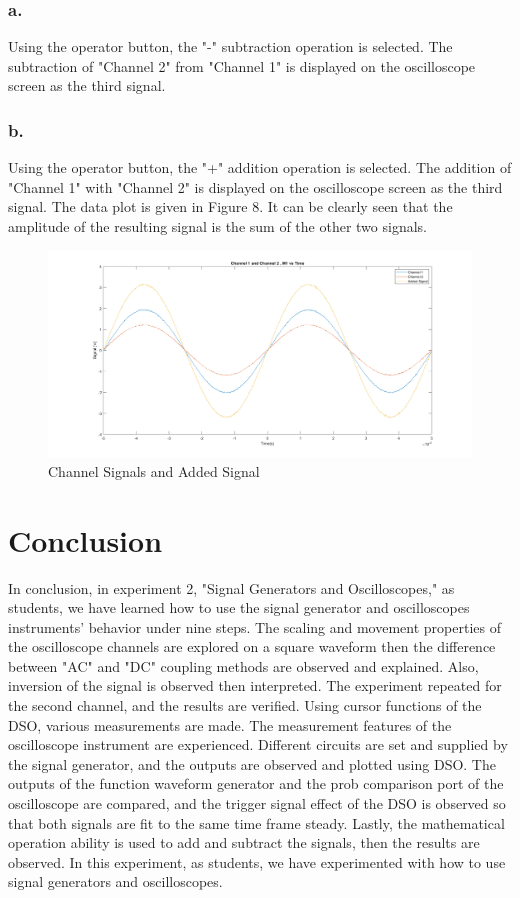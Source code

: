 \documentclass[letterpaper,12pt]{article}
\begin{document}
\subsubsection{a.}
Using the operator button, the "-" subtraction operation is selected. The subtraction of "Channel 2" from "Channel 1" is displayed on the oscilloscope screen as the third signal. 
\subsubsection{b.}
Using the operator button, the "+" addition operation is selected. The addition of "Channel 1" with "Channel 2" is displayed on the oscilloscope screen as the third signal. The data plot is given in Figure 8. It can be clearly seen that the amplitude of the resulting signal is the sum of the other two signals. 
\begin{figure}[H]
	\caption{ Channel Signals and Added Signal  }
	\centering
	\includegraphics[width=1\textwidth]{9b.png}
\end{figure}


\section{Conclusion}
In conclusion, in experiment 2, "Signal Generators and Oscilloscopes," as students, we have learned how to use the signal generator and oscilloscopes instruments' behavior under nine steps. The scaling and movement properties of the oscilloscope channels are explored on a square waveform then the difference between "AC" and "DC" coupling methods are observed and explained. Also, inversion of the signal is observed then interpreted. The experiment repeated for the second channel, and the results are verified. Using cursor functions of the DSO, various measurements are made. The measurement features of the oscilloscope instrument are experienced. Different circuits are set and supplied by the signal generator, and the outputs are observed and plotted using DSO. The outputs of the function waveform generator and the prob comparison port of the oscilloscope are compared, and the trigger signal effect of the DSO is observed so that both signals are fit to the same time frame steady. Lastly, the mathematical operation ability is used to add and subtract the signals, then the results are observed.  In this experiment, as students, we have experimented with how to use signal generators and oscilloscopes.
\end{document}
